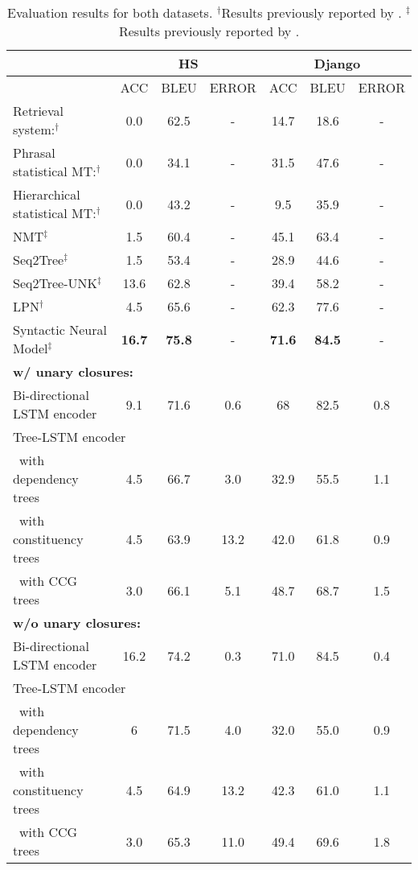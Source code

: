 \begin{table}[p]
\begin{tabular}{ l c c c c c c }

\hline
& \multicolumn{3}{c}{\textbf{HS}} & \multicolumn{3}{c}{\textbf{Django}}\\
\hline
& ACC & BLEU & ERROR & ACC & BLEU & ERROR \\
\hline
Retrieval system:$^\dagger$ & 0.0 & 62.5 & - & 14.7 & 18.6 & - \\
Phrasal statistical MT:$^\dagger$ & 0.0 & 34.1 & - & 31.5 & 47.6 & - \\
Hierarchical statistical MT:$^\dagger$ & 0.0 & 43.2 & - & 9.5 & 35.9 & - \\
\hline 
NMT$^\ddagger$ & 1.5 & 60.4 & - & 45.1 & 63.4 & - \\
Seq2Tree$^\ddagger$ & 1.5 & 53.4 & - & 28.9 & 44.6 & - \\
Seq2Tree-UNK$^\ddagger$ & 13.6 & 62.8 & - & 39.4 & 58.2 & - \\
LPN$^\dagger$ & 4.5 & 65.6 & - & 62.3 & 77.6 & - \\
Syntactic Neural Model$^\ddagger$ & \textbf{16.7} & \textbf{75.8} & - & \textbf{71.6} & \textbf{84.5} & - \\
\hline
\multicolumn{7}{l}{\textbf{w/ unary closures:}} \\
Bi-directional LSTM encoder & 9.1 & 71.6 & 0.6 & 68 & 82.5 & 0.8  \\
\multicolumn{7}{l}{Tree-LSTM encoder} \\
\ with dependency trees & 4.5 & 66.7 & 3.0 & 32.9 & 55.5 & 1.1 \\
\ with constituency trees & 4.5 & 63.9 & 13.2 & 42.0 & 61.8 & 0.9 \\
\ with CCG trees & 3.0 & 66.1 & 5.1 & 48.7 & 68.7 & 1.5 \\
\multicolumn{7}{l}{\textbf{w/o unary closures:}}\\
Bi-directional LSTM encoder & 16.2 & 74.2 & 0.3 & 71.0 & 84.5 & 0.4  \\
\multicolumn{7}{l}{Tree-LSTM encoder} \\
\ with dependency trees & 6 & 71.5 & 4.0 & 32.0 & 55.0 & 0.9 \\
\ with constituency trees & 4.5 & 64.9 & 13.2 & 42.3 & 61.0 & 1.1 \\
\ with CCG trees & 3.0 & 65.3 & 11.0 & 49.4 & 69.6 & 1.8 \\
\hline
\end{tabular}
\caption[Final results]{Evaluation results for both datasets. $^\dagger$Results previously reported by \cite{Ling2016}. $^\ddagger$Results previously reported by \cite{Yin2017}.}
\label{table:evaluation}
\end{table}

